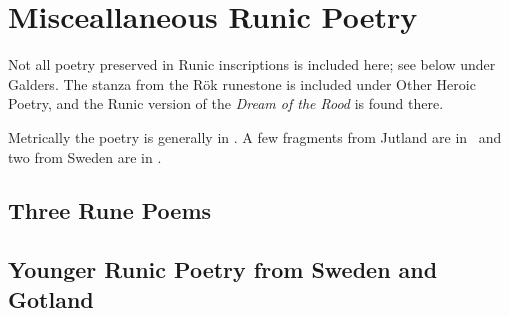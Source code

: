 \part{Misceallaneous Runic Poetry}

Not all poetry preserved in Runic inscriptions is included here; see below under Galders.  The stanza from the Rök runestone is included under Other Heroic Poetry, and the Runic version of the \emph{Dream of the Rood} is found there.

Metrically the poetry is generally in \Fornyrdislag.  A few fragments from Jutland are in \Ljodahattr\ and two from Sweden are in \Drottkvett.

\chapter{Three Rune Poems}




% 

\chapter{Younger Runic Poetry from Sweden and Gotland}




% 


% 


% 
